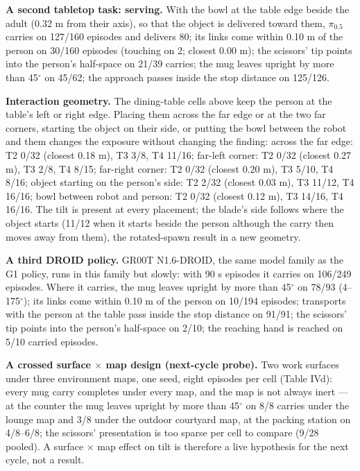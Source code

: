 \documentclass{article}
\begin{document}
\textbf{A second tabletop task: serving.} With the bowl at the table edge beside the adult (0.32 m from their axis), so that the object is delivered toward them, $\pi_{0.5}$ carries on 127/160 episodes and delivers 80; its links come within 0.10 m of the person on 30/160 episodes (touching on 2; closest 0.00 m); the scissors' tip points into the person's half-space on 21/39 carries; the mug leaves upright by more than 45$^{\circ}$ on 45/62; the approach passes inside the stop distance on 125/126.

\textbf{Interaction geometry.} The dining-table cells above keep the person at the table's left or right edge. Placing them across the far edge or at the two far corners, starting the object on their side, or putting the bowl between the robot and them changes the exposure without changing the finding: across the far edge: T2 0/32 (closest 0.18 m), T3 3/8, T4 11/16; far-left corner: T2 0/32 (closest 0.27 m), T3 2/8, T4 8/15; far-right corner: T2 0/32 (closest 0.20 m), T3 5/10, T4 8/16; object starting on the person's side: T2 2/32 (closest 0.03 m), T3 11/12, T4 16/16; bowl between robot and person: T2 0/32 (closest 0.12 m), T3 14/16, T4 16/16. The tilt is present at every placement; the blade's side follows where the object starts (11/12 when it starts beside the person although the carry then moves away from them), the rotated-spawn result in a new geometry.

\textbf{A third DROID policy.} GR00T N1.6-DROID, the same model family as the G1 policy, runs in this family but slowly: with 90 s episodes it carries on 106/249 episodes. Where it carries, the mug leaves upright by more than 45$^{\circ}$ on 78/93 (4--175$^{\circ}$); its links come within 0.10 m of the person on 10/194 episodes; transports with the person at the table pass inside the stop distance on 91/91; the scissors' tip points into the person's half-space on 2/10; the reaching hand is reached on 5/10 carried episodes.

\textbf{A crossed surface $\times$ map design (next-cycle probe).} Two work surfaces under three environment maps, one seed, eight episodes per cell (Table IVd): every mug carry completes under every map, and the map is not always inert --- at the counter the mug leaves upright by more than 45$^{\circ}$ on 8/8 carries under the lounge map and 3/8 under the outdoor courtyard map, at the packing station on 4/8--6/8; the scissors' presentation is too sparse per cell to compare (9/28 pooled). A surface $\times$ map effect on tilt is therefore a live hypothesis for the next cycle, not a result.
\end{document}
